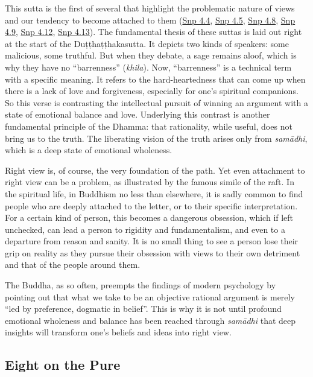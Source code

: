\documentclass[12pt,openany]{book}%
\begin{document}
This sutta is the first of several that highlight the problematic nature of views and our tendency to become attached to them (\href{https://suttacentral.net/snp4.4/en/sujato}{Snp 4.4}, \href{https://suttacentral.net/snp4.5/en/sujato}{Snp 4.5}, \href{https://suttacentral.net/snp4.8/en/sujato}{Snp 4.8}, \href{https://suttacentral.net/snp4.9/en/sujato}{Snp 4.9}, \href{https://suttacentral.net/snp4.12/en/sujato}{Snp 4.12}, \href{https://suttacentral.net/snp4.13/en/sujato}{Snp 4.13}). The fundamental thesis of these suttas is laid out right at the start of the \textsanskrit{Duṭṭhaṭṭhakasutta}. It depicts two kinds of speakers: some malicious, some truthful. But when they debate, a sage remains aloof, which is why they have no “barrenness” (\textit{khila}). Now, “barrenness” is a technical term with a specific meaning. It refers to the hard-heartedness that can come up when there is a lack of love and forgiveness, especially for one’s spiritual companions. So this verse is contrasting the intellectual pursuit of winning an argument with a state of emotional balance and love. Underlying this contrast is another fundamental principle of the Dhamma: that rationality, while useful, does not bring us to the truth. The liberating vision of the truth arises only from \textit{\textsanskrit{samādhi}}, which is a deep state of emotional wholeness.

Right view is, of course, the very foundation of the path. Yet even attachment to right view can be a problem, as illustrated by the famous simile of the raft. In the spiritual life, in Buddhism no less than elsewhere, it is sadly common to find people who are deeply attached to the letter, or to their specific interpretation. For a certain kind of person, this becomes a dangerous obsession, which if left unchecked, can lead a person to rigidity and fundamentalism, and even to a departure from reason and sanity. It is no small thing to see a person lose their grip on reality as they pursue their obsession with views to their own detriment and that of the people around them.

The Buddha, as so often, preempts the findings of modern psychology by pointing out that what we take to be an objective rational argument is merely “led by preference, dogmatic in belief”. This is why it is not until profound emotional wholeness and balance has been reached through \textit{\textsanskrit{samādhi}} that deep insights will transform one’s beliefs and ideas into right view.

\subsection*{Eight on the Pure}
\end{document}
